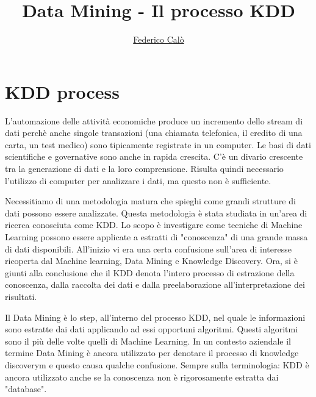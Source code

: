 \documentclass[a4paper]{extarticle}
\title{Data Mining - Il processo KDD}
\author{\href{http://www.federicocalo.it}{Federico Calò} }
\date{}
\begin{document}
\maketitle
\newpage
\tableofcontents

\newpage

\section{KDD process}

L'automazione delle attività economiche produce un incremento dello stream di dati perchè anche singole transazioni (una chiamata telefonica, il credito di una carta, un test medico) sono tipicamente registrate in un computer.
Le basi di dati scientifiche e governative sono anche in rapida crescita. C'è un divario crescente tra la generazione di dati e la loro comprensione. Risulta quindi necessario l'utilizzo di computer per analizzare i dati, ma questo non è sufficiente.

Necessitiamo di una metodologia matura che spieghi come grandi strutture di dati possono essere analizzate. Questa metodologia è stata studiata in un'area di ricerca conosciuta come KDD. Lo scopo è investigare come tecniche di Machine Learning possono 
essere applicate a estratti di "conoscenza" di una grande massa di dati disponibili. All'inizio vi era una certa confusione sull'area di interesse ricoperta dal Machine learning, Data Mining e Knowledge Discovery. 
Ora, si è giunti alla conclusione che il KDD denota l'intero processo di estrazione della conoscenza, dalla raccolta dei dati e dalla preelaborazione all'interpretazione dei risultati.

Il Data Mining è lo step, all'interno del processo KDD, nel quale le informazioni sono estratte dai dati applicando ad essi opportuni algoritmi. Questi algoritmi sono il più delle volte quelli di Machine Learning. 
In un contesto aziendale il termine Data Mining è ancora utilizzato per denotare il processo di knowledge discoverym e questo causa qualche confusione. Sempre sulla terminologia: KDD è ancora utilizzato anche se la conoscenza non è rigorosamente estratta dai "database". 
\end{document}
